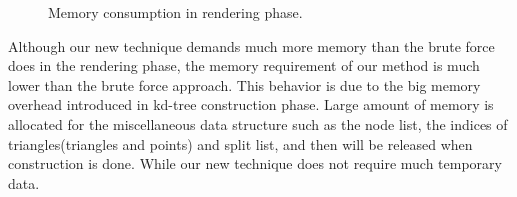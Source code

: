 \begin{figure}[ftp] 
    \centering 
    \renewcommand{\thefigure}{\thechapter.\arabic{figure}}
    \caption[]{Memory consumption in rendering phase.}
    \label{fig:memory_consumption} 
\end{figure}  

Although our new technique demands much more memory than the brute force does in the rendering phase, the memory requirement of our method is much lower than the brute force approach. This behavior is due to the big memory overhead introduced in kd-tree construction phase. Large amount of memory is allocated for the miscellaneous data structure such as the node list, the indices of triangles(triangles and points) and split list, and then will be released when construction is done. While our new technique does not require much temporary data. 


